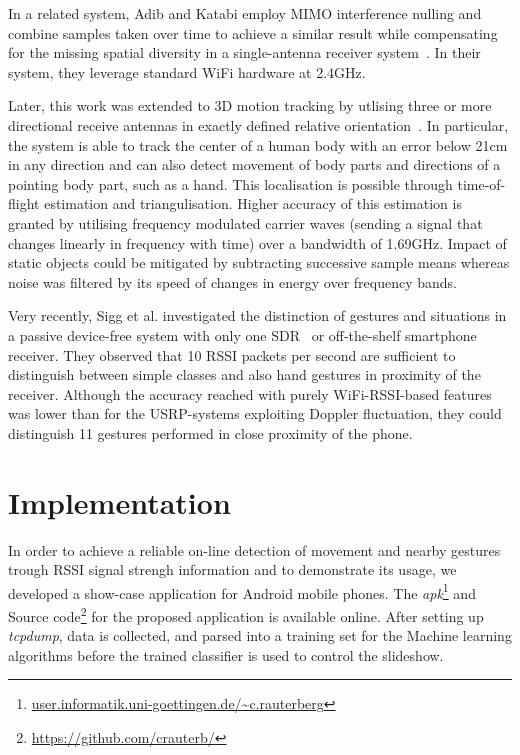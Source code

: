 \documentclass[conference]{IEEEtran}
\begin{document}
In a related system, Adib and Katabi employ MIMO interference nulling and combine samples taken over time to achieve a similar result while compensating for the missing spatial diversity in a single-antenna receiver system~\cite{Pervasive_Adib_2013}.
In their system, they leverage standard WiFi hardware at 2.4GHz.

Later, this work was extended to 3D motion tracking by utlising three or more directional receive antennas in exactly defined relative orientation~\cite{RFSensing_Adib_2014}. 
In particular, the system is able to track the center of a human body with an error below 21cm in any direction and can also detect movement of body parts and directions of a pointing body part, such as a hand. 
This localisation is possible through time-of-flight estimation and triangulisation.
Higher accuracy of this estimation is granted by utilising frequency modulated carrier waves (sending a signal that changes linearly in frequency with time) over a bandwidth of 1.69GHz.
Impact of static objects could be mitigated by subtracting successive sample means whereas noise was filtered by its speed of changes in energy over frequency bands. 

Very recently, Sigg et al. investigated the distinction of gestures and situations in a passive device-free system with only one SDR~\cite{Pervasive_Sigg_2014b} or off-the-shelf smartphone~\cite{Pervasive_Sigg_2014,RFSensing_Sigg_2014} receiver.
They observed that 10 RSSI packets per second are sufficient to distinguish between simple classes and also hand gestures in proximity of the receiver.
Although the accuracy reached with purely WiFi-RSSI-based features was lower than for the USRP-systems exploiting Doppler fluctuation, they could distinguish 11 gestures performed in close proximity of the phone.

\section{Implementation}
In order to achieve a reliable on-line detection of movement and nearby gestures trough RSSI signal strengh information and to demonstrate its usage, we developed a show-case application for Android mobile phones.
The \emph{apk}\footnote{\url{user.informatik.uni-goettingen.de/~c.rauterberg}} and Source code\footnote{\label{footnoteImplementation}\url{https://github.com/crauterb/}} for the proposed application is available online. 
After setting up \emph{tcpdump}, data is collected, and parsed into a training set for the Machine learning algorithms before the trained classifier is used to control the slideshow.
\end{document}
